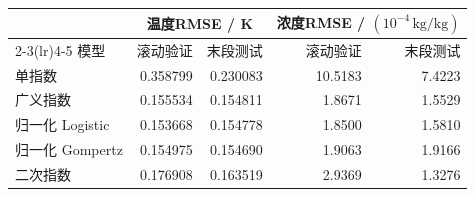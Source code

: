 \begin{tabular}{lrrrr}
\toprule
& \multicolumn{2}{c}{温度RMSE / K}& \multicolumn{2}{c}{浓度RMSE / $(10^{-4}\,\mathrm{kg/kg})$}\\
\cmidrule(lr){2-3}\cmidrule(lr){4-5}
模型 & 滚动验证 & 末段测试 & 滚动验证 & 末段测试\\
\midrule
单指数 & 0.358799 & 0.230083 & 10.5183 & 7.4223 \\
广义指数 & 0.155534 & 0.154811 & 1.8671 & 1.5529 \\
归一化 Logistic & 0.153668 & 0.154778 & 1.8500 & 1.5810 \\
归一化 Gompertz & 0.154975 & 0.154690 & 1.9063 & 1.9166 \\
二次指数 & 0.176908 & 0.163519 & 2.9369 & 1.3276 \\
\bottomrule
\end{tabular}
